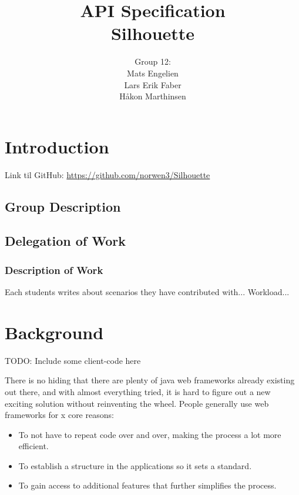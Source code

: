\documentclass[12pt]{article}
\begin{document}
\title{%
    API Specification\\
    \large Silhouette}
\author{%
    Group 12:\\
    Mats Engelien\\
    Lars Erik Faber\\
    Håkon Marthinsen}
\date{}
\maketitle

\newpage

\tableofcontents

\newpage

\section{Introduction}

Link til GitHub: \href{https://github.com/norwen3/Silhouette}{https://github.com/norwen3/Silhouette}

\subsection{Group Description}

    \subsection{Delegation of Work}

    \subsubsection{Description of Work}
    Each students writes about scenarios they have contributed with...
    Workload...

\section{Background}
TODO: Include some client-code here

There is no hiding that there are plenty of java web frameworks already existing out there, and with almost everything tried, it is hard to figure out a new exciting solution without reinventing the wheel. People generally use web frameworks for x core reasons:

\begin{itemize}
    \item To not have to repeat code over and over, making the process a lot more efficient.
    \item To establish a structure in the applications so it sets a standard.
    \item To gain access to additional features that further simplifies the process.
\end{itemize}
\end{document}
